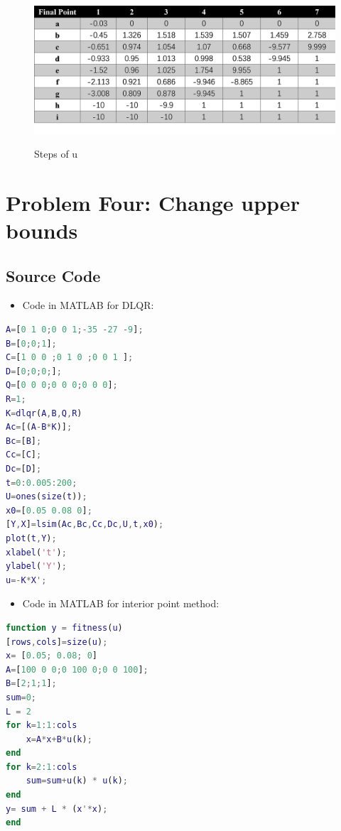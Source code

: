 \documentclass{mcmthesis}
\begin{document}
\begin{figure}[H]%
  \centering
  \caption{Steps of u}
  \includegraphics[width=50ex]{Optimal Control of a Linear Discrete System/MCM20200128/picture/changeA/表格.png} %
  \label{Fig.RNN} %
\end{figure}


\section{Problem Four: Change upper bounds}






\begin{appendices}

\section{ Source Code}
\begin{itemize}
\item Code in MATLAB for DLQR:
\end{itemize}
\begin{lstlisting}[language=MATLAB, caption=LQR in MATLAB]
A=[0 1 0;0 0 1;-35 -27 -9];
B=[0;0;1];
C=[1 0 0 ;0 1 0 ;0 0 1 ];
D=[0;0;0;];
Q=[0 0 0;0 0 0;0 0 0];
R=1;
K=dlqr(A,B,Q,R)
Ac=[(A-B*K)];
Bc=[B];
Cc=[C];
Dc=[D];
t=0:0.005:200;
U=ones(size(t));
x0=[0.05 0.08 0];
[Y,X]=lsim(Ac,Bc,Cc,Dc,U,t,x0);
plot(t,Y);
xlabel('t');
ylabel('Y');
u=-K*X';
\end{lstlisting}
\begin{itemize}
\item Code in MATLAB for interior point method:
\end{itemize}

\begin{lstlisting}[language=MATLAB, caption=Function for interior point method]
function y = fitness(u)
[rows,cols]=size(u);
x= [0.05; 0.08; 0]
A=[100 0 0;0 100 0;0 0 100];
B=[2;1;1];
sum=0;
L = 2
for k=1:1:cols
    x=A*x+B*u(k);
end
for k=2:1:cols
    sum=sum+u(k) * u(k);
end
y= sum + L * (x'*x);
end
\end{lstlisting}


\end{appendices}
\end{document}

